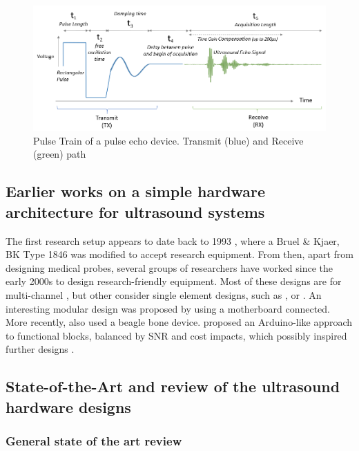 \documentclass{article}
\begin{document}
\begin{figure}[H]
 \includegraphics[width=\linewidth]{images/PulseTrain.PNG}
 \caption{Pulse Train of a pulse echo device. Transmit (blue) and Receive (green) path}
 \label{fig:PulseTrain}
\end{figure}




\subsection{Earlier works on a simple hardware architecture for ultrasound systems}

The first research setup appears to date back to 1993 \cite{jensen_deconvolution_1993}, where a Bruel \& Kjaer, BK Type 1846 was modified to accept research equipment.
From then, apart from designing medical probes, several groups of researchers have worked since the early 2000s to design research-friendly equipment. Most of these designs are for multi-channel \cite{boni_ula-op_2016,boni_reconfigurable_2012,boni_ultrasound_2018,qiu_flexible_2012,levesque_architecture_2011}, but other consider single element designs, such as \cite{carotenuto_fast_2005}, or \cite{richard_low-cost_2008}. An interesting modular design was proposed by \cite{wall_high-speed_2010} using a motherboard connected. More recently, \cite{taylor_development_2017} also used a beagle bone device. \cite{jonveaux_arduino-like_2017} proposed an Arduino-like approach to functional blocks, balanced by SNR and cost impacts, which possibly inspired further designs \cite{golabek_construction_2019}.

\subsection{State-of-the-Art and review of the ultrasound hardware designs}

\subsubsection{General state of the art review}
\end{document}
